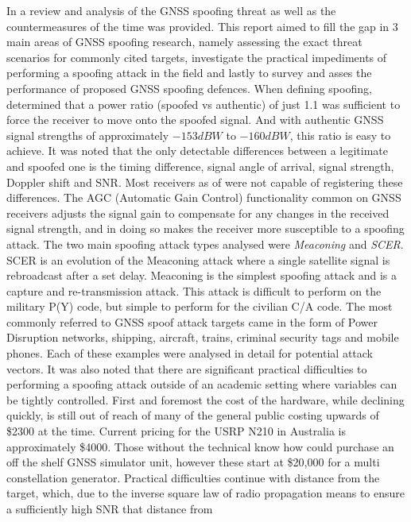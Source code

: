 In \textcite{RN32} a review and analysis of the GNSS spoofing threat as well as the countermeasures of the time was provided. This report aimed
to fill the gap in 3 main areas of GNSS spoofing research, namely assessing the exact threat scenarios for commonly cited targets, investigate the practical impediments
of performing a spoofing attack in the field and lastly to survey and asses the performance of proposed GNSS spoofing defences. When defining spoofing, \citeauthor{RN32}
determined that a power ratio (spoofed vs authentic) of just 1.1 was sufficient to force the receiver to move onto the spoofed signal. And with authentic GNSS signal
strengths of approximately $-153dBW$ to $-160dBW$, this ratio is easy to achieve. It was noted that the
only detectable differences between a legitimate and spoofed one is the timing difference, signal angle of arrival, signal strength, Doppler shift and SNR. Most receivers
as of \citeyear{RN32} were not capable of registering these differences. The AGC (Automatic Gain Control) functionality common on GNSS receivers adjusts the signal gain
to compensate for any changes in the received signal strength, and in doing so makes the receiver more susceptible to a spoofing attack. The two main spoofing attack
types analysed were \emph{Meaconing} and \emph{SCER}. SCER is an evolution of the Meaconing attack where a single satellite signal is rebroadcast after a set delay.
Meaconing is the simplest spoofing attack and is a capture and re-transmission attack. This attack is difficult to perform on the military P(Y) code, but simple to perform
for the civilian C/A code. The most commonly referred to GNSS spoof attack targets came in the form of Power Disruption networks, shipping, aircraft, trains, criminal
security tags and mobile phones. Each of these examples were analysed in detail for potential attack vectors.
It was also noted that there are significant practical difficulties to performing a spoofing attack outside of an academic setting where variables can be tightly
controlled. First and foremost the cost of the hardware, while declining quickly, is still out of reach of many of the general public costing upwards of \$2300 at the
time. Current pricing for the USRP N210 in Australia is approximately \$4000. 
Those without the technical know how could purchase an off the shelf GNSS simulator unit, however these start at \$20,000 for a multi constellation generator. Practical
difficulties continue with distance from the target, which, due to the inverse square law of radio propagation means to ensure a sufficiently high SNR that distance from
